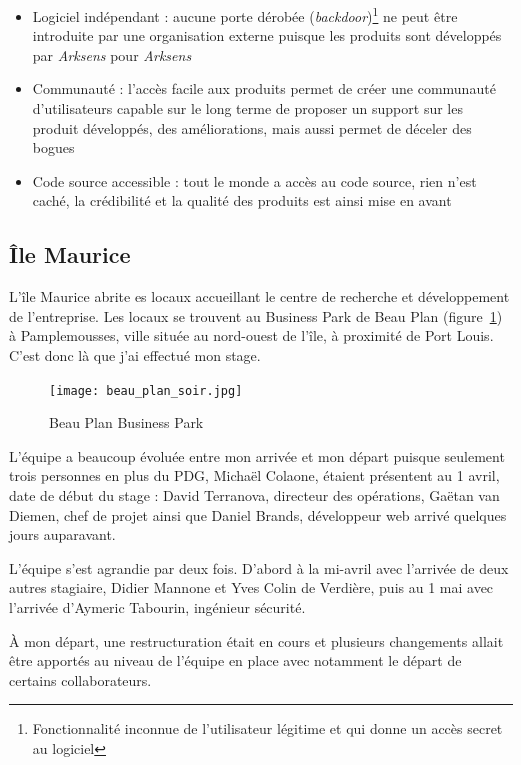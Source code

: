 \documentclass[a4paper,10pt, twoside]{report}
\begin{document}
\begin{spacing}{1.2}
\begin{itemize}
  \item Logiciel ind\'ependant : aucune porte d\'erob\'ee
  (\textit{backdoor})\footnote{Fonctionnalit\'e inconnue de l'utilisateur
  l\'egitime et qui donne un acc\`es secret au logiciel} ne peut
  \^etre introduite par une organisation externe puisque les produits sont
  d\'evelopp\'es par \textit{Arksens} pour \textit{Arksens}
  \item Communaut\'e : l'acc\`es facile aux produits permet de cr\'eer une
  communaut\'e d'utilisateurs capable sur le long terme de proposer un
  support sur les produit d\'evelopp\'es, des am\'eliorations, mais aussi
  permet de d\'eceler des bogues
  \item Code source accessible : tout le monde a acc\`es au code source,
  rien n'est cach\'e, la cr\'edibilit\'e et la qualit\'e des produits est ainsi
  mise en avant
\end{itemize}

\subsection{\^Ile Maurice}
L'\^ile Maurice abrite es locaux accueillant le centre de recherche et
d\'eveloppement de l'entreprise. Les locaux se trouvent au Business Park de
Beau Plan (figure~\ref{beauPlan}) \`a Pamplemousses, ville situ\'ee au
nord-ouest de l'\^ile, \`a proximit\'e de Port Louis. C'est donc l\`a que
j'ai effectu\'e mon stage.

\begin{figure}[h!]
  \centering
  \texttt{[image: beau\_plan\_soir.jpg]}
  \caption{\label{beauPlan} Beau Plan Business Park}
\end{figure}

L'\'equipe a beaucoup \'evolu\'ee entre mon arriv\'ee et mon d\'epart puisque
seulement trois personnes en plus du PDG, Micha\"el Colaone, \'etaient
pr\'esentent au 1 avril, date de d\'ebut du stage : David Terranova,
directeur des op\'erations, Ga\"etan van Diemen, chef de projet ainsi que
Daniel Brands, d\'eveloppeur web arriv\'e quelques jours auparavant.

L'\'equipe s'est agrandie par deux fois. D'abord \`a la mi-avril avec
l'arriv\'ee de deux autres stagiaire, Didier Mannone et
Yves Colin de Verdi\`ere, puis au 1 mai avec l'arriv\'ee d'Aymeric
Tabourin, ing\'enieur s\'ecurit\'e.

\`A mon d\'epart, une restructuration \'etait en cours et plusieurs changements
allait \^etre apport\'es au niveau de l'\'equipe en place avec notamment le
d\'epart de certains collaborateurs.


\end{spacing}
\end{document}
